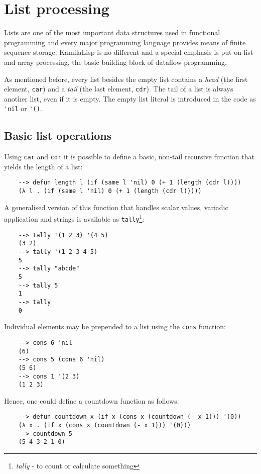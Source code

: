 
\chapter{List processing}

Lists are one of the most important data structures used in functional programming and every major programming language provides means of finite sequence storage. KamilaLisp is no different and a special emphasis is put on list and array processing, the basic building block of dataflow programming.

As mentioned before, every list besides the empty list contains a \textit{head} (the first element, \verb|car|) and a \textit{tail} (the last element, \verb|cdr|). The tail of a list is always another list, even if it is empty. The empty list literal is introduced in the code as \verb|'nil| or \verb|'()|. 

\section{Basic list operations}

Using \verb|car| and \verb|cdr| it is possible to define a basic, non-tail recursive function that yields the length of a list:

\begin{Verbatim}
    --> defun length l (if (same l 'nil) 0 (+ 1 (length (cdr l))))
    (λ l . (if (same l 'nil) 0 (+ 1 (length (cdr l)))))
\end{Verbatim}

A generalised version of this function that handles scalar values, variadic application and strings is available as \verb|tally|\footnote{\textit{tally} - to count or calculate something}:

\begin{Verbatim}
    --> tally '(1 2 3) '(4 5)
    (3 2)
    --> tally '(1 2 3 4 5)
    5
    --> tally "abcde"
    5
    --> tally 5
    1
    --> tally
    0
\end{Verbatim}

Individual elements may be prepended to a list using the \verb|cons| function:

\begin{Verbatim}
    --> cons 6 'nil
    (6)
    --> cons 5 (cons 6 'nil)
    (5 6)
    --> cons 1 '(2 3)
    (1 2 3)
\end{Verbatim}

Hence, one could define a countdown function as follows:

\begin{Verbatim}
    --> defun countdown x (if x (cons x (countdown (- x 1))) '(0))
    (λ x . (if x (cons x (countdown (- x 1))) '(0)))
    --> countdown 5
    (5 4 3 2 1 0)
\end{Verbatim}

